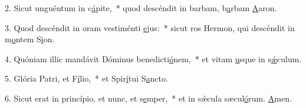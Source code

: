 2. Sicut unguéntum in c\uline{á}pite,~* quod descéndit in barbam, b\uline{a}rbam \uline{A}aron.\par 
3. Quod descéndit in oram vestiménti \uline{e}jus:~* sicut ros Hermon, qui descéndit in m\uline{o}ntem S\uline{i}on.\par 
4. Quóniam illic mandávit Dóminus benedicti\uline{ó}nem,~* et vitam \uline{u}sque in s\uline{ǽ}culum.\par 
5. Glória Patri, et F\uline{í}lio,~* et Spir\uline{í}tui S\uline{a}ncto.\par 
6. Sicut erat in princípio, et nunc, et s\uline{e}mper,~* et in sǽcula sæcul\uline{ó}rum. \uline{A}men.\par 
